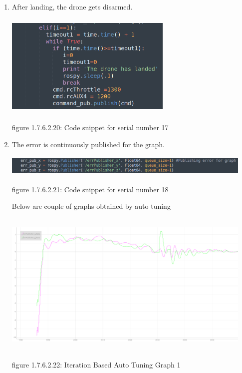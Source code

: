 \documentclass[a4paper,12pt,oneside]{book}
\begin{document}
\begin{enumerate}
\item After landing, the drone gets disarmed.


\includegraphics[width = 8cm , height= 5cm]{disarm.png}
\begin{center}
    figure 1.7.6.2.20: Code snippet for serial number 17
\end{center}
\item The error is continuously published for the graph.


\includegraphics[width = 12cm , height= 1cm]{err_pub_9.png}
\begin{center}
    figure 1.7.6.2.21: Code snippet for serial number 18
\end{center}
Below are couple of graphs obtained by auto tuning


\includegraphics[width = 12cm , height= 7cm]{Autotune_iteration_1.png}
\begin{center}
    figure 1.7.6.2.22: Iteration Based Auto Tuning Graph 1
\end{center}


\end{enumerate}
\end{document}
